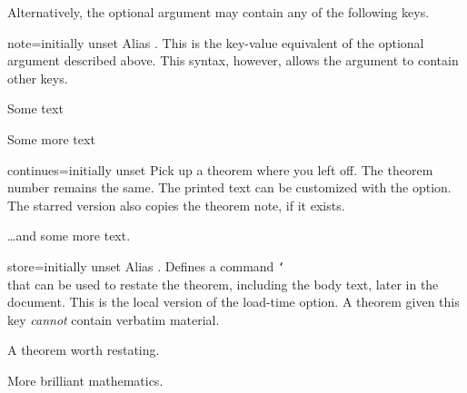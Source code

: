 \documentclass{ltxdoc}
\begin{document}
Alternatively, the optional argument may contain any of the following keys.

\begin{docKey}{note}{=}{initially unset}
Alias . This is the key-value equivalent of the optional argument described above. This syntax, however, allows the argument to contain other keys.

\begin{keythmscode}[]
\begin{theorem}
Some text
\end{theorem}
\begin{theorem}[note=another heading]
Some more text
\end{theorem}
\end{keythmscode}
\end{docKey}


\begin{docKey}{continues}{\sarg=}{initially unset}
Pick up a theorem where you left off. The theorem number remains the same. The printed text can be customized with the  option. The starred version also copies the theorem note, if it exists.
\begin{keythmscode}[]
\begin{theorem}[continues=foo]
\dots and some more text.
\end{theorem}
\end{keythmscode}
\end{docKey}

\begin{docKey}{store}{=}{initially unset}
Alias . Defines a command \texttt{\char`\\} that can be used to restate the theorem, including the body text, later in the document. This is the local version of the  load-time option. A theorem given this key \emph{cannot} contain verbatim material.
\begin{keythmscode}[]
\begin{theorem}[store=blub]
A theorem worth restating.
\end{theorem}
More brilliant mathematics.
\blub
\end{keythmscode}
\end{docKey}
\end{document}
